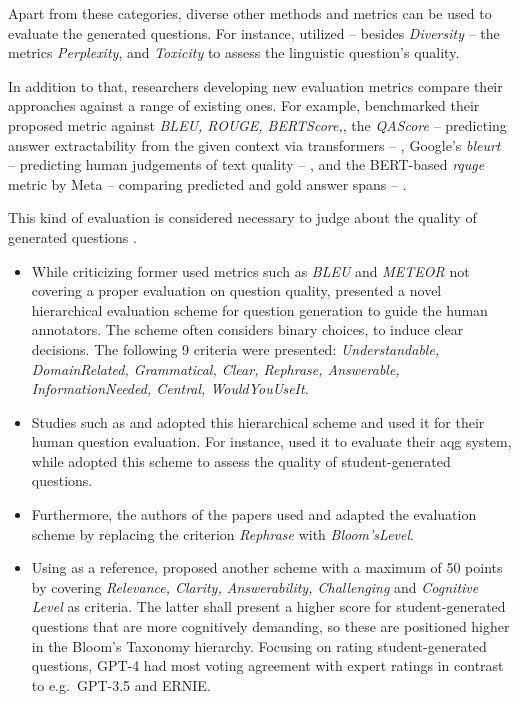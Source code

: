  Apart from these categories, diverse other methods and metrics can be used to evaluate the generated questions. For instance, \cite{yang_heuristic_2024} utilized -- besides \textit{Diversity} -- the metrics \textit{Perplexity}, and \textit{Toxicity} to assess the linguistic question's quality. 

In addition to that, researchers developing new evaluation metrics compare their approaches against a range of existing ones. For example, \cite{nguyen_reference-based_2024} benchmarked their proposed metric against \textit{BLEU, ROUGE, BERTScore,}, the \textit{QAScore} -- predicting answer extractability from the given context via transformers -- \cite{ji_qascoreunsupervised_2022}, Google's \textit{\ac{bleurt}} -- predicting human judgements of text quality -- \cite{sellam_bleurt_2020}, and the BERT-based \textit{\ac{rquge}} metric by Meta -- comparing predicted and gold answer spans -- \cite{mohammadshahi_rquge_2023}.

\pagebreak

 This kind of evaluation is considered necessary to judge about the quality of generated questions \cite{horbach_linguistic_2020}.

\begin{itemize}
   \item While criticizing former used metrics such as \textit{BLEU} and \textit{METEOR} not covering a proper evaluation on question quality, \cite{horbach_linguistic_2020} presented a novel hierarchical evaluation scheme for question generation to guide the human annotators. The scheme often considers binary choices, to induce clear decisions. The following 9 criteria were presented: \textit{Understandable, DomainRelated, Grammatical, Clear, Rephrase, Answerable, InformationNeeded, Central, WouldYouUseIt}. 
   \item Studies such as \cite{steuer_i_2021} and \cite{moore_assessing_2022} adopted this hierarchical scheme and used it for their human question evaluation. For instance, \cite{steuer_i_2021} used it to evaluate their \ac{aqg} system, while \cite{moore_assessing_2022} adopted this scheme to assess the quality of student-generated questions.
   \item Furthermore, the authors of the papers \cite{scaria_how_2024,scaria_automated_2024} used and adapted the evaluation scheme by replacing the criterion \textit{Rephrase} with \textit{Bloom'sLevel}.
   \item Using \cite{moore_assessing_2022} as a reference, \cite{mi_comparative_2024} proposed another scheme with a maximum of 50 points by covering \textit{Relevance, Clarity, Answerability, Challenging} and \textit{Cognitive Level} as criteria. The latter shall present a higher score for student-generated questions that are more cognitively demanding, so these are positioned higher in the Bloom's Taxonomy hierarchy. Focusing on rating student-generated questions, GPT-4 had most voting agreement with expert ratings in contrast to e.g.\ GPT-3.5 and ERNIE.
\end{itemize}

